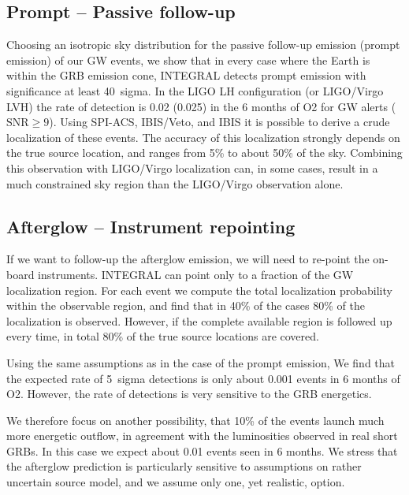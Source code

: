\documentclass[11pt]{article}
\begin{document}
\subsection*{Prompt -- Passive follow-up}

Choosing an isotropic sky distribution for the passive follow-up
emission (prompt emission) of our GW events, we show that in every
case where the Earth is within the GRB emission cone, INTEGRAL detects
prompt emission with significance at least 40~sigma. In the LIGO LH
configuration (or LIGO/Virgo LVH) the rate of detection is 0.02
(0.025) in the 6 months of O2 for GW alerts ($\mathrm{SNR} \geq
9$). Using SPI-ACS, IBIS/Veto, and IBIS it is possible to derive a
crude localization of these events. The accuracy of this localization
strongly depends on the true source location, and ranges from 5\% to
about 50\% of the sky. Combining this observation with LIGO/Virgo
localization can, in some cases, result in a much constrained sky
region than the LIGO/Virgo observation alone.

\subsection*{Afterglow -- Instrument repointing}

If we want to follow-up the afterglow emission, we will need to re-point the
on-board instruments. INTEGRAL can point only to a fraction of the GW
localization region. For each event we compute the total localization
probability within the observable region, and find that in 40\% of the cases
80\% of the localization is observed. However, if the complete available region
is followed up every time, in total 80\% of the true source locations are
covered.

Using the same assumptions as in the case of the prompt emission, We find that
the expected rate of 5~sigma detections is only about 0.001 events in 6 months
of O2. However, the rate of detections is very sensitive to the GRB energetics.

We therefore focus on another possibility, that 10\% of the events launch much
more energetic outflow, in agreement with the luminosities observed in real
short GRBs. In this case we expect about 0.01 events seen in 6 months. We
stress that the afterglow prediction is particularly sensitive to assumptions on
rather uncertain source model, and we assume only one, yet realistic, option.

\end{document}
